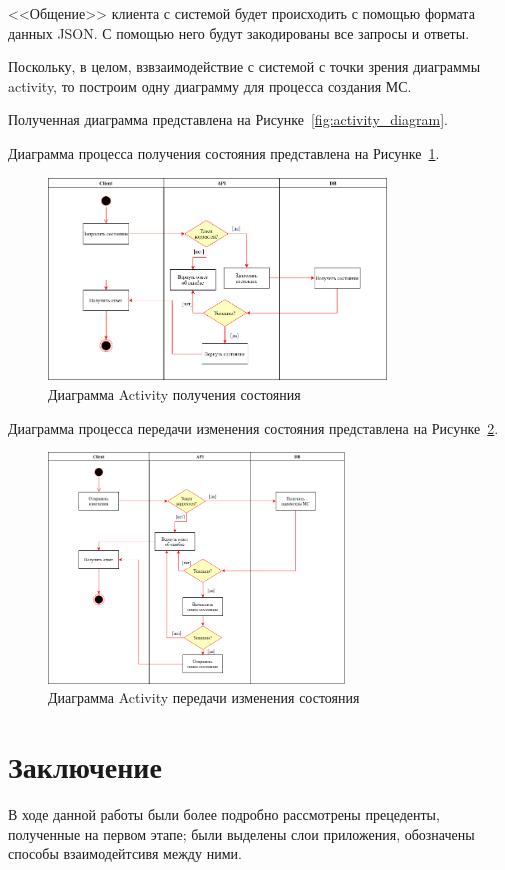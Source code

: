 \documentclass[a4paper,10pt]{article}
\begin{document}
<<Общение>> клиента с системой будет происходить с помощью формата данных JSON.
С помощью него будут закодированы все запросы и ответы.

Поскольку, в целом, взвзаимодействие с системой с точки зрения диаграммы activity,
то построим одну диаграмму для процесса создания МС.

Полученная диаграмма представлена на Рисунке~\ref{fig:activity_diagram}.

Диаграмма процесса получения состояния представлена на Рисунке~\ref{fig:activity_get_state}.

\begin{figure}[htpb]
    \centering
    \includegraphics[width=0.8\textwidth]{diagrams/activity_get_state.png}
    \caption{Диаграмма Activity получения состояния}
    \label{fig:activity_get_state}
\end{figure}

Диаграмма процесса передачи изменения состояния представлена на Рисунке~\ref{fig:activity_send_change}.

\begin{figure}[htpb]
    \centering
    \includegraphics[width=0.7\textwidth]{diagrams/activity_send_change.png}
    \caption{Диаграмма Activity передачи изменения состояния}
    \label{fig:activity_send_change}
\end{figure}
\section*{Заключение}\label{Заключение}

В ходе данной работы были более подробно рассмотрены прецеденты, полученные
на первом этапе; были выделены слои приложения, обозначены способы взаимодейтсивя
между ними.
\end{document}
